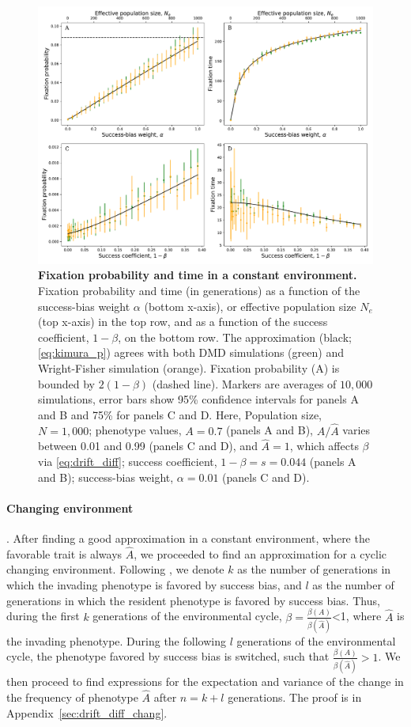 \documentclass[12pt]{extarticle}
\begin{document}
\begin{figure}[h]
    \includegraphics[width=\linewidth]{kimura_var.pdf}
  \caption{\textbf{Fixation probability and time in a constant environment.}
  Fixation probability and time (in generations) as a function of the success-bias weight $\alpha$ (bottom x-axis), or effective population size $N_e$ (top x-axis) in the top row, and as a function of the success coefficient, $1-\beta$, on the bottom row.
  The approximation (black; \cref{eq:kimura_p}) agrees with both DMD simulations (green) and Wright-Fisher simulation (orange).
  Fixation probability (A) is bounded by $2(1-\beta)$ (dashed line).
  Markers are averages of $10,000$ simulations, error bars show 95\% confidence intervals for panels A and B and 75\% for panels C and D.
   Here, Population size, $N=1,000$; phenotype values, $A=0.7$ (panels A and B), 
   $A/\hat{A}$ varies between 0.01 and 0.99 (panels C and D), and $\hat{A}=1$, which affects $\beta$ via \cref{eq:drift_diff};
   success coefficient, $1-\beta=s=0.044$ (panels A and B); 
   success-bias weight, $\alpha=0.01$ (panels C and D).
   }
  \label{fig:var_alpha}
\end{figure}


\paragraph*{Changing environment}. After finding a good approximation in a constant environment, where the favorable trait is always $\hat{A}$, we proceeded to find an approximation for a cyclic changing environment. 
Following \citep{changeEnv}, we denote $k$ as the number of generations in which the invading phenotype is favored by success bias, and $l$ as the number of generations in which the resident phenotype is favored by success bias.
Thus, during the first $k$ generations of the environmental cycle, $\beta=\frac{\beta(A)}{\beta(\hat{A})}$<1, where $\hat{A}$ is the invading phenotype. During the following $l$ generations of the environmental cycle, the phenotype favored by success bias is switched, such that $\frac{\beta(A)}{\beta(\hat{A})}>1$.
We then proceed to find expressions for the expectation and variance of the change in the frequency of phenotype $\hat{A}$ after $n=k+l$ generations. 
The proof is in Appendix~\ref{sec:drift_diff_chang}.
\\
\end{document}
